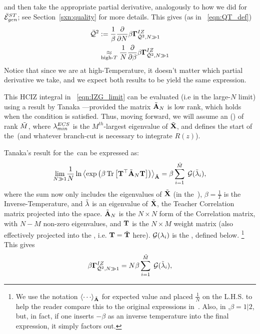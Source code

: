 and then take the appropriate partial derivative,
analogously to how we did for $\bar{\mathcal{E}}^{ST}_{gen}$; see Section~\ref{sxn:quality} for more details.
This gives (as in \EQN~\ref{eqn:QT_def})
\begin{align}
\label{eqn:IZG_generate_Q2}
\QT &:= \frac{1}{\beta}\frac{\partial }{\partial N}\IZGINF  \\ 
&\underset{\text{high-}T}{\approx}
\frac{1}{N}\frac{\partial }{\partial \beta}\IZGINF 
\end{align}
Notice that since we are at high-Temperature, it doesn't matter which partial derivative we take,
and we expect both results to be yield the same expression.

This HCIZ integral in \EQN~\ref{eqn:IZG_limit} can be evaluated
(i.e in the large-$N$ limit) using a result by Tanaka ---provided
the matrix $\tilde{\mathbf{A}}_{\small{N}}$ is low rank, which holds when the \TRACELOG condition is satisfied.
Thus, moving forward, we will assume an
\EffectiveCorrelationSpace (\ECS) of rank $\tilde{M}$, where $\lambda^{ECS}_{min}$ is the $M^{th}$-largest eigenvalue of $\tilde{\mathbf{X}}$,
and defines the start of the~\ECS (and whatever branch-cut is necessary to integrate $R(z)$).

Tanaka's result for the~\ECS can be expressed as:
\begin{equation}
  \label{eqn:tanaka_result}
  \underset{N\gg 1}{\lim}\frac{1}{N}\ln
\Expected[\AECS]{\exp\left(\beta \Trace{\TMAT^{\top}\AECSN\TMAT}\right)}
  =\beta\sum\limits_{i=1}^{\MECS}\;\GNECSI,
\end{equation}
where the sum now only includes the eigenvalues of $\tilde{\mathbf{X}}$ (in the~\ECS), $\beta=\tfrac{1}{T}$
is the Inverse-Temperature, and $\tilde{\lambda}$ is an eigenvalue of $\tilde{\mathbf{X}}$, the Teacher
Correlation matrix projected into the \ECS space.
$\tilde{\mathbf{A}}_{\small{N}}$ is the $N \times N$ form of the \Student Correlation matrix,
with $N-M$ non-zero eigenvalues, and ${\mathbf{T}}$ is the $N\times M$ \Teacher  weight matrix
(also effectively projected into the \ECS, i.e. ${\mathbf{T}}=\tilde{\mathbf{T}}$ here).
$\mathcal{G}(\lambda_{i})$ is the \GEN, defined below.
\footnote{We use the notation $\Expected[\AECS]{\cdots}$ for expected value and placed $\tfrac{1}{N}$ on the L.H.S.
to help the reader compare this to the original expressions in~\cite{Tanaka2007, Tanaka2008}.
Also,  in \cite{Tanaka2007, Tanaka2008},$\beta=1|2$, but, in fact, if one inserts $-\beta$ as an inverse temperature into the final expression, it simply factors out.}
This gives
\begin{equation}
\label{eqn:tanaka_result2}
\IZGINF = N\beta\sum\limits_{i=1}^{\MECS}\;\GNECSI,
\end{equation}



